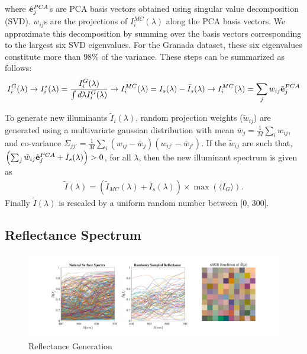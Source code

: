 \documentclass{jov}
\begin{document}
where $\hat{{\bf e}}_j^{PCA}$s are PCA basis vectors obtained using 
singular value decomposition (SVD). $w_{ij}$s are the projections 
of $I_i^{MC}(\lambda)$ along the PCA basis vectors. We approximate 
this decomposition by summing over the basis vectors corresponding to
the largest six SVD eigenvalues. For the Granada dataset, these six 
eigenvalues constitute more than $98\%$ of the variance. These steps
can be summarized as follows:
\begin{align}
I^G_i(\lambda) \rightarrow I_i^s(\lambda) = \frac{I^G_i(\lambda)}{\int d\lambda I^G_i(\lambda)} \rightarrow I_i^{MC}(\lambda) = I_{s}(\lambda) - \bar{I}_{s}(\lambda) \rightarrow I_i^{MC}(\lambda) = \sum_j w_{ij}\hat{{\bf e}}_j^{PCA}
\end{align}

To generate new illuminants $\tilde{I}_i(\lambda)$, random 
projection weights ($\tilde{w}_{ij}$) are generated using a multivariate 
gaussian distribution with mean $\bar{w}_j = \frac{1}{M}\sum_i w_{ij}$, 
and co-variance $\Sigma_{jj'} = \frac{1}{M} \sum_i \left(w_{ij} -\bar{w}_j\right)\left(w_{ij'} -\bar{w}_{j'}\right) $. If the $\tilde{w}_{ij}$ are such that, $\left( \sum_j \tilde{w}_{ij} \hat{{\bf e}}_j^{PCA} +  \bar{I}_{s} (\lambda)\right) > 0$, for all $\lambda$, then the new illuminant spectrum is given as 
\begin{align}
\tilde{I}(\lambda) = \left( \tilde{I}_{MC}(\lambda) + \bar{I}_{s}(\lambda)\right) 
\times \max\left(\langle I_{G}\rangle\right) .
\end{align}
Finally $\tilde{I}(\lambda)$ is rescaled by a uniform random number between [0, 300].

\subsection{Reflectance Spectrum}
\begin{figure}
\centering
	\includegraphics[width=\textwidth]{Figure15/reflectance.pdf}
    \caption{Reflectance Generation}
    \label{fig:reflectanceGeneration}
\end{figure}
\end{document}
